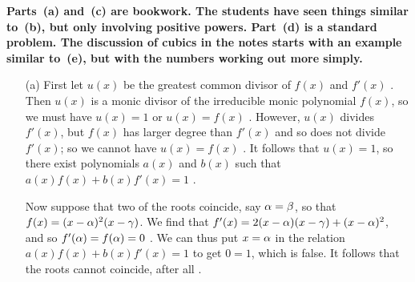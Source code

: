 \documentclass[a4paper]{article}
\begin{document}
\begin{solution}
 \textbf{Parts~(a) and~(c) are bookwork.  The students have seen
  things similar to~(b), but only involving positive powers.  Part~(d)
  is a standard problem.  The discussion of cubics in the notes starts
  with an example similar to~(e), but with the numbers working out
  more simply.}
 \begin{itemize}
  \item[(a)] First let $u(x)$ be the greatest common divisor of $f(x)$
   and $f'(x)$ \mk.  Then $u(x)$ is a monic divisor of the irreducible
   monic polynomial $f(x)$, so we must have $u(x)=1$ or $u(x)=f(x)$ \mk.
   However, $u(x)$ divides $f'(x)$, but $f(x)$ has larger degree than
   $f'(x)$ and so does not divide $f'(x)$; so we cannot have
   $u(x)=f(x)$ \mk.  It follows that $u(x)=1$, so there exist polynomials
   $a(x)$ and $b(x)$ such that $a(x)f(x)+b(x)f'(x)=1$ \mk.  

   Now suppose that two of the roots coincide, say $\alpha=\beta$, so
   that $f(x)=(x-\alpha)^2(x-\gamma)$.  We find that
   $f'(x)=2(x-\alpha)(x-\gamma)+(x-\alpha)^2$, and so $f'(\alpha)=f(\alpha)=0$ \mk.  We
   can thus put $x=\alpha$ in the relation $a(x)f(x)+b(x)f'(x)=1$ to get
   $0=1$, which is false.  It follows that the roots cannot coincide,
   after all \mk.


\end{itemize}
\end{solution}
\end{document}
